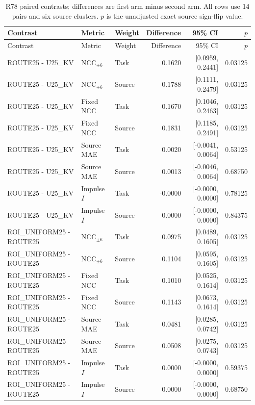 \begingroup\scriptsize\setlength{\tabcolsep}{2pt}
\begin{longtable}{p{.27\linewidth}p{.13\linewidth}lrrr}
\caption{R78 paired contrasts; differences are first arm minus second arm. All rows use 14 pairs and six source clusters. $p$ is the unadjusted exact source sign-flip value.}\\
\hline
Contrast & Metric & Weight & Difference & 95\% CI & $p$ \\ \hline
\endfirsthead
\hline
Contrast & Metric & Weight & Difference & 95\% CI & $p$ \\ \hline
\endhead
ROUTE25 - U25\_KV & NCC$_{\pm6}$ & Task & 0.1620 & [0.0959, 0.2441] & 0.03125 \\
ROUTE25 - U25\_KV & NCC$_{\pm6}$ & Source & 0.1788 & [0.1111, 0.2479] & 0.03125 \\
ROUTE25 - U25\_KV & Fixed NCC & Task & 0.1670 & [0.1046, 0.2463] & 0.03125 \\
ROUTE25 - U25\_KV & Fixed NCC & Source & 0.1831 & [0.1185, 0.2491] & 0.03125 \\
ROUTE25 - U25\_KV & Source MAE & Task & 0.0020 & [-0.0041, 0.0064] & 0.53125 \\
ROUTE25 - U25\_KV & Source MAE & Source & 0.0013 & [-0.0046, 0.0064] & 0.68750 \\
ROUTE25 - U25\_KV & Impulse $I$ & Task & -0.0000 & [-0.0000, 0.0000] & 0.78125 \\
ROUTE25 - U25\_KV & Impulse $I$ & Source & -0.0000 & [-0.0000, 0.0000] & 0.84375 \\
ROI\_UNIFORM25 - ROUTE25 & NCC$_{\pm6}$ & Task & 0.0975 & [0.0489, 0.1605] & 0.03125 \\
ROI\_UNIFORM25 - ROUTE25 & NCC$_{\pm6}$ & Source & 0.1104 & [0.0595, 0.1605] & 0.03125 \\
ROI\_UNIFORM25 - ROUTE25 & Fixed NCC & Task & 0.1010 & [0.0525, 0.1614] & 0.03125 \\
ROI\_UNIFORM25 - ROUTE25 & Fixed NCC & Source & 0.1143 & [0.0673, 0.1614] & 0.03125 \\
ROI\_UNIFORM25 - ROUTE25 & Source MAE & Task & 0.0481 & [0.0285, 0.0742] & 0.03125 \\
ROI\_UNIFORM25 - ROUTE25 & Source MAE & Source & 0.0508 & [0.0275, 0.0743] & 0.03125 \\
ROI\_UNIFORM25 - ROUTE25 & Impulse $I$ & Task & 0.0000 & [-0.0000, 0.0000] & 0.59375 \\
ROI\_UNIFORM25 - ROUTE25 & Impulse $I$ & Source & 0.0000 & [-0.0000, 0.0000] & 0.68750 \\

\end{longtable}
